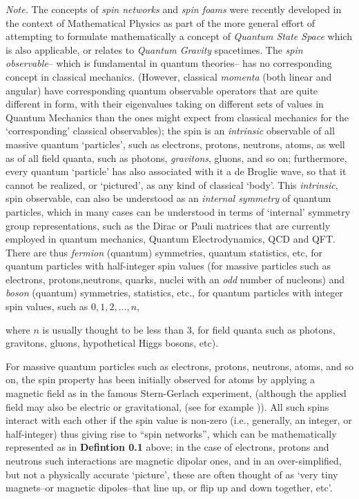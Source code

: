 \documentclass[12pt]{article}
\theoremstyle{plain}
\theoremstyle{definition}
\numberwithin{equation}{section}
\newcommand{\<}{{\langle}}
\begin{document}
\emph{Note.} 
  The concepts of {\em spin networks} and {\em spin foams} were recently developed in the context
of Mathematical Physics as part of the more general effort of attempting to formulate mathematically a concept of \emph{Quantum State Space} which is also applicable, or relates to \emph{Quantum Gravity} spacetimes. The {\em spin observable}-- which is fundamental in quantum theories-- has no corresponding concept in classical mechanics. (However, classical \emph{momenta} (both linear and angular) have corresponding quantum observable operators that are quite different in form, with their eigenvalues taking on different sets of values in Quantum Mechanics than the ones might expect from classical mechanics for the `corresponding' classical observables); the spin is an \emph{intrinsic} observable of all massive quantum `particles', such as electrons, protons, neutrons, atoms, as well as of all field quanta, such as photons, \emph{gravitons}, gluons, and so on; furthermore, every quantum `particle' has also associated with it a de Broglie wave, so that it cannot be realized, or `pictured', as any kind of classical `body'. This \emph{intrinsic}, spin observable, can also be understood as an \emph\emph{internal symmetry} of quantum particles, which in many cases can be understood in terms of `internal' symmetry group representations, such as the Dirac or Pauli matrices that are currently employed in quantum mechanics, Quantum Electrodynamics, QCD and QFT. There are thus \emph{fermion} (quantum) symmetries, quantum statistics, etc, for quantum particles with half-integer spin values (for massive particles such as electrons, protons,neutrons, quarks, nuclei with an \emph{odd} number of nucleons) and \emph{boson} (quantum) symmetries, statistics, etc., for quantum particles with integer spin values, such as $0, 1, 2, ..., n$, {where $n$ is usually thought to be less than $3$, for field quanta such as photons, gravitons, gluons, hypothetical Higgs bosons, etc).  

For massive quantum particles such as electrons, protons, neutrons, atoms, and so on, the spin property has been initially observed for atoms by applying a magnetic field as in the famous Stern-Gerlach experiment, (although the applied field may also be electric or gravitational, (see for example \cite{WH52})). All such spins interact with each other if the spin value is non-zero (i.e., generally, an integer, or half-integer) thus giving rise to ``spin networks'', which can be mathematically represented as in \textbf{Defintion 0.1} above; in the case of electrons, protons and neutrons such interactions are magnetic dipolar ones, and in an over-simplified, but not a physically accurate `picture', these are often thought of as `very tiny magnets--or magnetic dipoles--that line up, or flip up and down together, etc'. 

}
\end{document}
